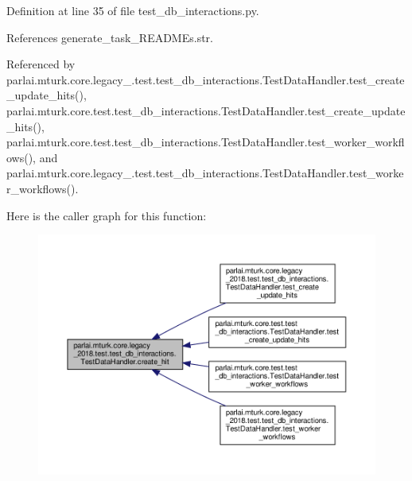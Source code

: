 Definition at line 35 of file test\+\_\+db\+\_\+interactions.\+py.



References generate\+\_\+task\+\_\+\+R\+E\+A\+D\+M\+Es.\+str.



Referenced by parlai.\+mturk.\+core.\+legacy\+\_.\+test.\+test\+\_\+db\+\_\+interactions.\+Test\+Data\+Handler.\+test\+\_\+create\+\_\+update\+\_\+hits(), parlai.\+mturk.\+core.\+test.\+test\+\_\+db\+\_\+interactions.\+Test\+Data\+Handler.\+test\+\_\+create\+\_\+update\+\_\+hits(), parlai.\+mturk.\+core.\+test.\+test\+\_\+db\+\_\+interactions.\+Test\+Data\+Handler.\+test\+\_\+worker\+\_\+workflows(), and parlai.\+mturk.\+core.\+legacy\+\_.\+test.\+test\+\_\+db\+\_\+interactions.\+Test\+Data\+Handler.\+test\+\_\+worker\+\_\+workflows().

Here is the caller graph for this function\+:
\nopagebreak
\begin{figure}[H]
\begin{center}
\leavevmode
\includegraphics[width=350pt]{classparlai_1_1mturk_1_1core_1_1legacy__2018_1_1test_1_1test__db__interactions_1_1TestDataHandler_a4b6e2a2603dfb8ae8dfb74c84bb57c1b_icgraph}
\end{center}
\end{figure}
\mbox{\label{classparlai_1_1mturk_1_1core_1_1legacy__2018_1_1test_1_1test__db__interactions_1_1TestDataHandler_ae4a243a3b7e3c5422f0ce0c4dc46c78e}} 
